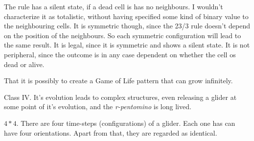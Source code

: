\documentclass[10pt,a4paper,boxed]{hmcpset}
\begin{document}
\begin{problem}[Assignment 16]
\end{problem}
\begin{solution}
The rule has a silent state, if a dead cell is has no neighbours. I wouldn't characterize it as totalistic, without having specified some kind of binary value to the neighbouring cells. It is symmetric though, since the 23/3 rule doesn't depend on the position of the neighbours. So each symmetric configuration will lead to the same result. It is legal, since it is symmetric and shows a silent state. It is not peripheral, since the outcome is in any case dependent on whether the cell os dead or alive.
\end{solution}


\begin{problem}[Assignment 17]
\end{problem}
\begin{solution}
That it is possibly to create a Game of Life pattern that can grow infinitely.
\end{solution}


\begin{problem}[Assignment 18]
\end{problem}
\begin{solution}
Class IV. It's evolution leads to complex structures, even releasing a glider at some point of it's evolution, and the \emph{r-pentomino} is long lived.
\end{solution}

\begin{problem}[Assignment 19]
\end{problem}
\begin{solution}
$4*4$. There are four time-steps (configurations) of a glider. Each one has can have four orientations. Apart from that, they are regarded as identical.
\end{solution}
\end{document}
